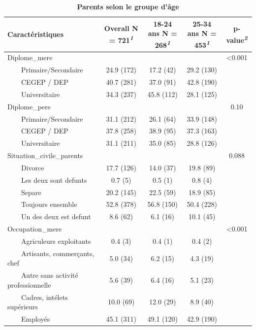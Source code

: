 \documentclass[
]{article}
\begin{document}
\newpage
\begin{table}[!t]
\caption{\label{tab:unnamed-chunk-17}\textbf{Parents selon le groupe d'âge}} 
\fontsize{12.0pt}{14.4pt}\selectfont
\begin{tabular*}{\linewidth}{@{\extracolsep{\fill}}lcccc}
\toprule
\textbf{Caractéristiques} & \textbf{Overall}  N = 721\textsuperscript{\textit{1}} & \textbf{18-24 ans}  N = 268\textsuperscript{\textit{1}} & \textbf{25-34 ans}  N = 453\textsuperscript{\textit{1}} & \textbf{p-value}\textsuperscript{\textit{2}} \\ 
\midrule\addlinespace[2.5pt]
Diplome\_mere &  &  &  & <0.001 \\ 
    Primaire/Secondaire & 24.9 (172) & 17.2 (42) & 29.2 (130) &  \\ 
    CEGEP / DEP & 40.7 (281) & 37.0 (91) & 42.8 (190) &  \\ 
    Universitaire & 34.3 (237) & 45.8 (112) & 28.1 (125) &  \\ 
Diplome\_pere &  &  &  & 0.10 \\ 
    Primaire/Secondaire & 31.1 (212) & 26.1 (64) & 33.9 (148) &  \\ 
    CEGEP / DEP & 37.8 (258) & 38.9 (95) & 37.3 (163) &  \\ 
    Universitaire & 31.1 (211) & 35.0 (85) & 28.8 (126) &  \\ 
Situation\_civile\_parents &  &  &  & 0.088 \\ 
    Divorce & 17.7 (126) & 14.0 (37) & 19.8 (89) &  \\ 
    Les deux sont defunts & 0.7 (5) & 0.5 (1) & 0.8 (4) &  \\ 
    Separe & 20.2 (145) & 22.5 (59) & 18.9 (85) &  \\ 
    Toujours ensemble & 52.8 (378) & 56.8 (150) & 50.4 (228) &  \\ 
    Un des deux est defunt & 8.6 (62) & 6.1 (16) & 10.1 (45) &  \\ 
Occupation\_mere &  &  &  & <0.001 \\ 
    Agriculeurs exploitants & 0.4 (3) & 0.4 (1) & 0.4 (2) &  \\ 
    Artisants, commerçants, chef & 5.0 (34) & 6.2 (15) & 4.3 (19) &  \\ 
    Autre sans activité professionnelle & 5.6 (39) & 6.4 (16) & 5.1 (23) &  \\ 
    Cadres, intélets supérieurs & 10.0 (69) & 12.0 (29) & 8.9 (40) &  \\ 
    Employés & 45.1 (311) & 49.1 (120) & 42.9 (190) &  \\ 

\end{tabular*}
\end{table}
\end{document}
